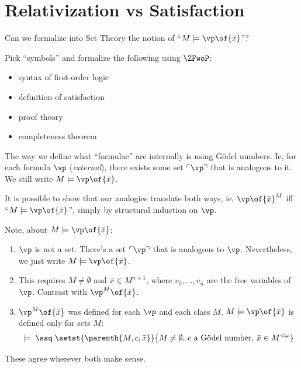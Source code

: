 \section{Relativization vs Satisfaction} \label{Ch3:Sec:Satisfaction}

Can we formalize into Set Theory the notion of ``$M \models \vp\of{\bar{x}}$''?

Pick ``symbols'' and formalize the following using $\ZFwoP$:
\begin{itemize}
    \item syntax of first-order logic
    \item definition of satisfaction
    \item proof theory
    \item completeness theorem
\end{itemize}

The way we define what ``formulae'' are internally is using Gödel numbers. Ie, for each formula $\vp$ (\textit{external}), there exists some set $\ulcorner \vp \urcorner$ that is analogous to it. We still write $M \models \vp\of{\bar{x}}$.

It is possible to show that our analogies translate both ways, ie, $\vp\of{\bar{x}}^M$ iff ``$M \models \vp\of{\bar{x}}$'', simply by structural induction on $\vp$.


Note, about $M \models \vp\of{\bar{x}}$:
\begin{enumerate}
    \item $\vp$ is not a set. There's a set $\ulcorner \vp \urcorner$ that is analogous to $\vp$. Nevertheless, we just write $M \models \vp\of{\bar{x}}$.
    \item This requires $M \ne \emptyset$ and $\bar{x} \in M^{n + 1}$, where $v_0, \ldots, v_n$ are the free variables of $\vp$. Contrast with $\vp^M\of{\bar{x}}$.
    \item $\vp^M\of{\bar{x}}$ was defined for each $\vp$ and each class $M$. $M \models \vp\of{\bar{x}}$ is defined only for sets $M$:
    \begin{align*}
        \models \; \ssq \; \setst{\parenth{M, c, \bar{x}}}{M \ne \emptyset, \, c \text{ a Gödel number}, \, \bar{x} \in M^{<\omega}}
    \end{align*}
\end{enumerate}

These agree wherever both make sense.

